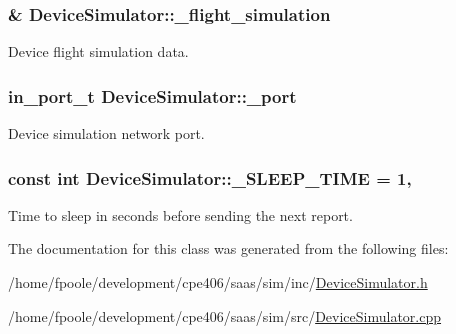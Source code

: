 \subsubsection[{\+\_\+flight\+\_\+simulation}]{\& Device\+Simulator\+::\+\_\+flight\+\_\+simulation\hspace{0.3cm}{\ttfamily [protected]}}\label{class_device_simulator_a39367b0a28cf99fbb615661f78a71f70}
Device flight simulation data. \hypertarget{class_device_simulator_a2d67d85410bca0c3f8080ad51fcf8f49}{}
\subsubsection[{\+\_\+port}]{\setlength{\rightskip}{0pt plus 5cm}in\+\_\+port\+\_\+t Device\+Simulator\+::\+\_\+port\hspace{0.3cm}{\ttfamily [protected]}}\label{class_device_simulator_a2d67d85410bca0c3f8080ad51fcf8f49}
Device simulation network port. \hypertarget{class_device_simulator_ad55d715f56525df573e842582faecf4f}{}
\subsubsection[{\+\_\+\+S\+L\+E\+E\+P\+\_\+\+T\+I\+M\+E}]{\setlength{\rightskip}{0pt plus 5cm}const int Device\+Simulator\+::\+\_\+\+S\+L\+E\+E\+P\+\_\+\+T\+I\+M\+E = 1\hspace{0.3cm}{\ttfamily [static]}, {\ttfamily [protected]}}\label{class_device_simulator_ad55d715f56525df573e842582faecf4f}
Time to sleep in seconds before sending the next report. 

The documentation for this class was generated from the following files\+:\begin{DoxyCompactItemize}
\item 
/home/fpoole/development/cpe406/saas/sim/inc/\hyperlink{_device_simulator_8h}{Device\+Simulator.\+h}\item 
/home/fpoole/development/cpe406/saas/sim/src/\hyperlink{_device_simulator_8cpp}{Device\+Simulator.\+cpp}\end{DoxyCompactItemize}

